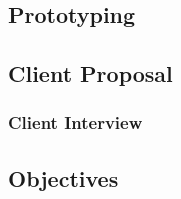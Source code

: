\subsection{Prototyping}
\subsection{Client Proposal}
\subsubsection{Client Interview}
\subsection{Objectives}